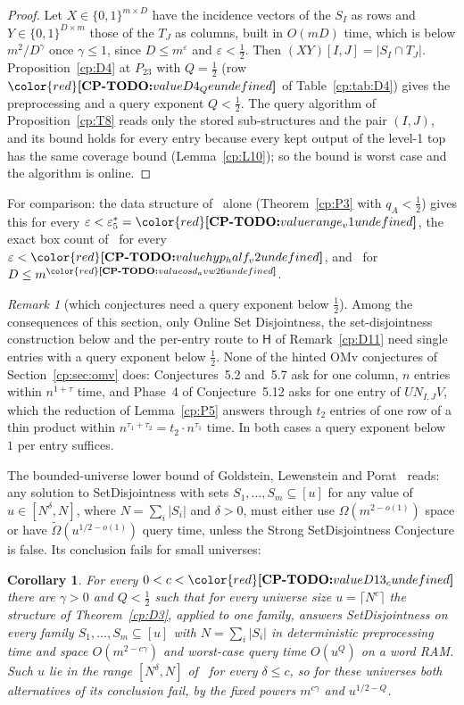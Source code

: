 \documentclass[11pt]{article}
\makeatletter
\newtheorem{corollary}[theorem]{Corollary}
\theoremstyle{definition}
\theoremstyle{remark}
\newtheorem{remark}[theorem]{Remark}
\DeclareRobustCommand{\CPTODO}[1]{{\color{red}\textbf{[CP-TODO:} #1\textbf{]}}}
\providecommand{\eps}{\varepsilon}
\newcommand{\abs}[1]{\lvert #1\rvert}
\newcommand{\Hyp}{\mathsf{H}}                 %
\newcommand{\es}{\varepsilon^*_5}             %
\newcommand{\Ptt}{P_{23}}                     %
\newcommand{\cpv}[1]{\ifcsname cpv@#1\endcsname\csname cpv@#1\endcsname\else\CPTODO{value #1 undefined}\fi}
\newcommand{\Vref}[1]{\ifcsname vtworef@#1\endcsname\csname vtworef@#1\endcsname\else\CPTODO{label #1 of the other paper undefined}\fi}
\makeatother
\begin{document}
\begin{proof}
Let $X\in\{0,1\}^{m\times D}$ have the incidence vectors of the $S_I$ as rows and $Y\in\{0,1\}^{D\times m}$ those of the $T_J$ as columns, built in $O(mD)$ time, which is below $m^2/D^\gamma$ once $\gamma\le1$, since $D\le m^\eps$ and $\eps<\frac12$. Then $(XY)[I,J]=\abs{S_I\cap T_J}$. Proposition~\ref{cp:D4} at $\Ptt$ with $Q=\frac12$ (row $\cpv{D4_Qe}$ of Table~\ref{cp:tab:D4}) gives the preprocessing and a query exponent $Q<\frac12$. The query algorithm of Proposition~\ref{cp:T8} reads only the stored sub-structures and the pair $(I,J)$, and its bound holds for every entry because every kept output of the level-1 top has the same coverage bound (Lemma~\ref{cp:L10}); so the bound is worst case and the algorithm is online.
\end{proof}

For comparison: the data structure of~\cite{v2} alone (Theorem~\ref{cp:P3} with $q_A<\frac12$) gives this for every $\eps<\es=\cpv{range_v1}$, the exact box count of~\cite[Theorem~\Vref{m:thm:fixedq}]{v2} for every $\eps<\cpv{hyp_half_v2}$, and~\cite{AV26} for $D\le m^{\cpv{osd_avw26}}$.

\begin{remark}[which conjectures need a query exponent below $\frac12$]\label{cp:D9}
Among the consequences of this section, only Online Set Disjointness, the set-disjointness construction below and the per-entry route to $\Hyp$ of Remark~\ref{cp:D11} need single entries with a query exponent below $\frac12$. None of the hinted OMv conjectures of Section~\ref{cp:sec:omv} does: Conjectures~5.2 and~5.7 ask for one column, $n$ entries within $n^{1+\tau}$ time, and Phase~4 of Conjecture~5.12 asks for one entry of $UN_{I,J}V$, which the reduction of Lemma~\ref{cp:P5} answers through $t_2$ entries of one row of a thin product within $n^{\tau_1+\tau_2}=t_2\cdot n^{\tau_1}$ time. In both cases a query exponent below~$1$ per entry suffices.
\end{remark}

The bounded-universe lower bound of Goldstein, Lewenstein and Porat~\cite[Theorem~4]{GLP19} reads: any solution to SetDisjointness with sets $S_1,\dots,S_m\subseteq[u]$ for any value of $u\in[N^\delta,N]$, where $N=\sum_i\abs{S_i}$ and $\delta>0$, must either use $\Omega(m^{2-o(1)})$ space or have $\tilde\Omega(u^{1/2-o(1)})$ query time, unless the Strong SetDisjointness Conjecture is false. Its conclusion fails for small universes:

\begin{corollary}\label{cp:D13}
For every $0<c<\cpv{D13_c}$ there are $\gamma>0$ and $Q<\frac12$ such that for every universe size $u=\lceil N^c\rceil$ the structure of Theorem~\ref{cp:D3}, applied to one family, answers SetDisjointness on every family $S_1,\dots,S_m\subseteq[u]$ with $N=\sum_i\abs{S_i}$ in deterministic preprocessing time and space $O(m^{2-c\gamma})$ and worst-case query time $O(u^Q)$ on a word RAM. Such $u$ lie in the range $[N^\delta,N]$ of~\cite[Theorem~4]{GLP19} for every $\delta\le c$, so for these universes both alternatives of its conclusion fail, by the fixed powers $m^{c\gamma}$ and $u^{1/2-Q}$.
\end{corollary}
\end{document}
